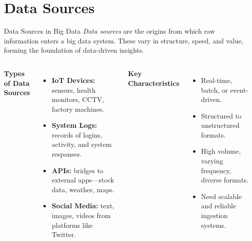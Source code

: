 \documentclass[aspectratio=169, table]{beamer}
\begin{document}
	\section{Data Sources}
	\begin{frame}[fragile]{Data Sources in Big Data}
		\vspace{20pt}
		\textit{Data sources} are the origins from which raw information enters a big data system. These vary in structure, speed, and value, forming the foundation of data-driven insights.
		
		\vspace{6pt}
		\begin{columns}[T,onlytextwidth]
			\textbf{Types of Data Sources}
			\begin{itemize}
				\item \textbf{IoT Devices:} sensors, health monitors, CCTV, factory machines.
				\item \textbf{System Logs:} records of logins, activity, and system responses.
				\item \textbf{APIs:} bridges to external apps—stock data, weather, maps.
				\item \textbf{Social Media:} text, images, videos from platforms like Twitter.
			\end{itemize}
			
			\textbf{Key Characteristics}
			\begin{itemize}
				\item Real-time, batch, or event-driven.
				\item Structured to unstructured formats.
				\item High volume, varying frequency, diverse formats.
				\item Need scalable and reliable ingestion systems.
			\end{itemize}
		\end{columns}
	\end{frame}
	
\end{document}
